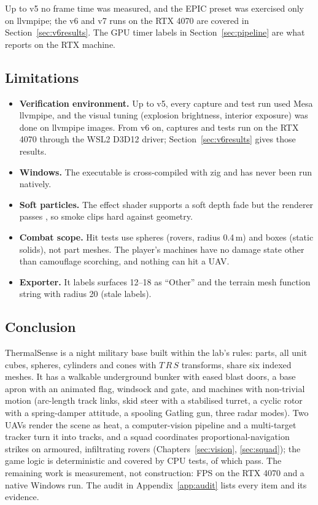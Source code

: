 Up to v5 no frame time was measured, and the EPIC preset was exercised only on llvmpipe; the v6 and v7 runs on the RTX 4070 are covered in Section~\ref{sec:v6results}. The GPU timer labels in Section~\ref{sec:pipeline} are what  reports on the RTX machine.

\subsection{Limitations}
\begin{itemize}
  \item \textbf{Verification environment.} Up to v5, every capture and test run used Mesa llvmpipe, and the visual tuning (explosion brightness, interior exposure) was done on llvmpipe images. From v6 on, captures and tests run on the RTX 4070 through the WSL2 D3D12 driver; Section~\ref{sec:v6results} gives those results.
  \item \textbf{Windows.} The executable is cross-compiled with zig and has never been run natively.
  \item \textbf{Soft particles.} The effect shader supports a soft depth fade but the renderer passes , so smoke clips hard against geometry.
  \item \textbf{Combat scope.} Hit tests use spheres (rovers, radius 0.4\,m) and boxes (static solids), not part meshes. The player's machines have no damage state other than camouflage scorching, and nothing can hit a UAV.
  \item \textbf{Exporter.} It labels surfaces 12--18 as ``Other'' and the terrain mesh function string with radius 20 (stale labels).
\end{itemize}

\subsection{Conclusion}
ThermalSense is a night military base built within the lab's rules: \nLeaves{} parts, all unit cubes, spheres, cylinders and cones with $T\,R\,S$ transforms,
share six indexed meshes. It has a walkable underground bunker with eased blast doors, a base apron with an animated flag, windsock and gate, and machines with
non-trivial motion (arc-length track links, skid steer with a stabilised turret, a cyclic rotor with a spring-damper attitude, a spooling Gatling gun, three radar modes). Two UAVs render the scene as heat, a computer-vision
pipeline and a multi-target tracker turn it into tracks, and a squad coordinates proportional-navigation strikes on armoured, infiltrating rovers (Chapters~\ref{sec:vision}, \ref{sec:squad}); the game logic is deterministic and covered by \nTests{} CPU tests, \nPass{} of which pass.
The remaining work is measurement, not construction: FPS on the RTX 4070 and a native Windows run. The audit in Appendix~\ref{app:audit} lists every item and its evidence.

